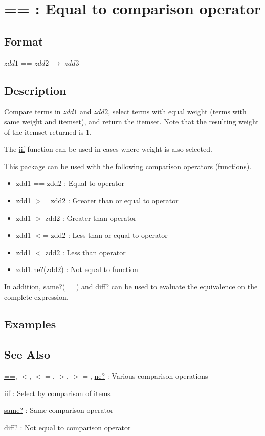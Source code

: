 
\section{== : Equal to comparison operator\label{sect:eq}}
\subsection*{Format}
$zdd1$ == $zdd2$ $\rightarrow$ $zdd3$

\subsection*{Description}

Compare terms in $zdd1$ and  $zdd2$, select terms with equal weight (terms with same weight and itemset), and return the itemset. 
Note that the resulting weight of the itemset returned is 1. 

The \hyperref[sect:iif]{iif} function can be used in cases where weight is also selected. 

This package can be used with the following comparison operators (functions). 
\begin{itemize}
\item zdd1 == zdd2   : Equal to operator
\item zdd1 $>$= zdd2   : Greater than or equal to operator
\item zdd1 $>$  zdd2   : Greater than operator 
\item zdd1 $<$= zdd2   : Less than or equal to operator 
\item zdd1 $<$  zdd2   : Less than operator 
\item zdd1.ne?(zdd2) : Not equal to function 
\end{itemize}

In addition,  \hyperref[sect:same?]{same?}(\hyperref[sect:same?]{==}) and \hyperref[sect:diff?]{diff?} can be used to   evaluate the equivalence on the complete expression. 


\subsection*{Examples}


\subsection*{See Also}
\hyperref[sect:eq]{==},
\hyperref[sect:lt]{$<$},
\hyperref[sect:le]{$<=$},
\hyperref[sect:gt]{$>$},
\hyperref[sect:ge]{$>=$},
\hyperref[sect:ne]{ne?} : Various comparison operations 

\hyperref[sect:iif]{iif} : Select by comparison of items

\hyperref[sect:same?]{same?} : Same comparison operator 

\hyperref[sect:diff?]{diff?} : Not equal to comparison operator

